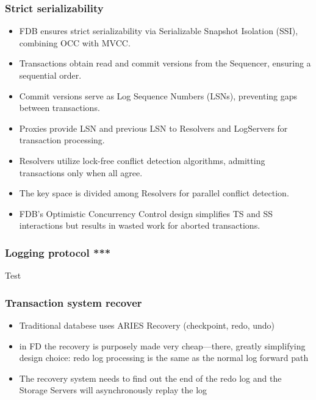 

\begin{frame}
	\frametitle{Strict serializability}
\begin{itemize}
  \item FDB ensures strict serializability via Serializable Snapshot Isolation (SSI), combining OCC with MVCC.
  \item Transactions obtain read and commit versions from the Sequencer, ensuring a sequential order.
  \item Commit versions serve as Log Sequence Numbers (LSNs), preventing gaps between transactions.
  \item Proxies provide LSN and previous LSN to Resolvers and LogServers for transaction processing.
  \item Resolvers utilize lock-free conflict detection algorithms, admitting transactions only when all agree.
  \item The key space is divided among Resolvers for parallel conflict detection.
  \item FDB's Optimistic Concurrency Control design simplifies TS and SS interactions but results in wasted work for aborted transactions.
\end{itemize}

 \end{frame}



\begin{frame}
	\frametitle{Logging protocol ***}
    Test

\end{frame}



\begin{frame}
	\frametitle{Transaction system recover}
    \begin{itemize}
    
        \item Traditional databese uses ARIES Recovery (checkpoint, redo, undo)
        \item in FD the recovery is purposely made very cheap—there, greatly simplifying design choice: redo log processing is the same as the normal log forward path
        \item The recovery system needs to find out the end of the redo log and the Storage Servers will asynchronously replay the log
        
\end{itemize}
\end{frame}

